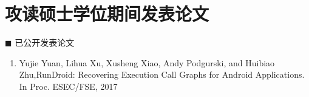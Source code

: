 \chapter*{攻读硕士学位期间发表论文}

\vskip 5mm

{\heiti $\blacksquare$ 已公开发表论文}\vskip 5mm

\begin{enumerate}
	
	\item Yujie Yuan, Lihua Xu, Xusheng Xiao, Andy Podgurski, and Huibiao Zhu,RunDroid: Recovering Execution Call Graphs for Android Applications. In Proc. ESEC/FSE, 2017
	
\end{enumerate}


